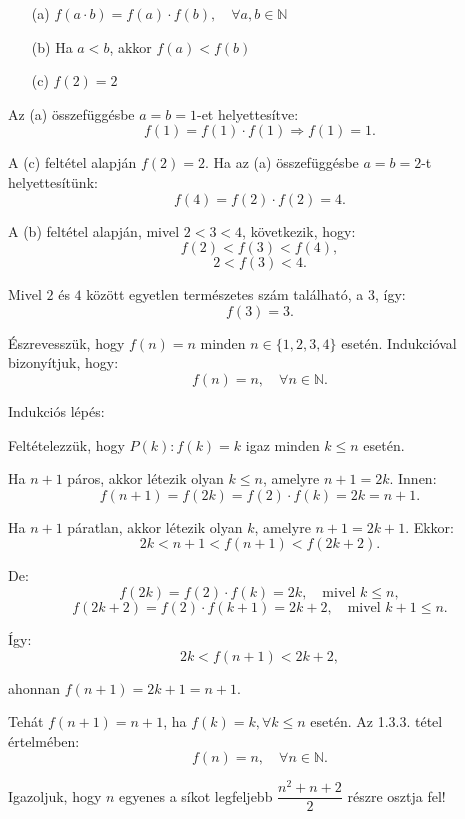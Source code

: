 \begin{enumerate}
\item[(a)] $f(a\cdot b)=f(a)\cdot f(b),\quad\forall a,b\in\mathbb{N}$
\item[(b)] Ha $a<b$, akkor $f(a)<f(b)$
\item[(c)] $f(2)=2$
\end{enumerate}
\begin{solution}
Az (a) összefüggésbe $a=b=1$-et helyettesítve: 
\[
f(1)=f(1)\cdot f(1)\Rightarrow f(1)=1.
\]

A (c) feltétel alapján $f(2)=2$. Ha az (a) összefüggésbe $a=b=2$-t
helyettesítünk: 
\[
f(4)=f(2)\cdot f(2)=4.
\]

A (b) feltétel alapján, mivel $2<3<4$, következik, hogy: 
\[
f(2)<f(3)<f(4),
\]
\[
2<f(3)<4.
\]

Mivel $2$ és $4$ között egyetlen természetes szám található, a $3$,
így: 
\[
f(3)=3.
\]

Észrevesszük, hogy $f(n)=n$ minden $n\in\{1,2,3,4\}$ esetén. Indukcióval
bizonyítjuk, hogy: 
\[
f(n)=n,\quad\forall n\in\mathbb{N}.
\]

Indukciós lépés:

Feltételezzük, hogy $P(k):f(k)=k$ igaz minden $k\leq n$ esetén.

Ha $n+1$ páros, akkor létezik olyan $k\leq n$, amelyre $n+1=2k$.
Innen: 
\[
f(n+1)=f(2k)=f(2)\cdot f(k)=2k=n+1.
\]

Ha $n+1$ páratlan, akkor létezik olyan $k$, amelyre $n+1=2k+1$.
Ekkor: 
\[
2k<n+1<f(n+1)<f(2k+2).
\]

De: 
\[
f(2k)=f(2)\cdot f(k)=2k,\quad\text{mivel }k\leq n,
\]
\[
f(2k+2)=f(2)\cdot f(k+1)=2k+2,\quad\text{mivel }k+1\leq n.
\]

Így: 
\[
2k<f(n+1)<2k+2,
\]

ahonnan $f(n+1)=2k+1=n+1$.

Tehát $f(n+1)=n+1$, ha $f(k)=k,\forall k\leq n$ esetén. Az 1.3.3.
tétel értelmében: 
\[
f(n)=n,\quad\forall n\in\mathbb{N}.
\]
\end{solution}
\begin{extraproblem}
Igazoljuk, hogy $n$ egyenes a síkot legfeljebb $\dfrac{n^{2}+n+2}{2}$
részre osztja fel! 
\end{extraproblem}

